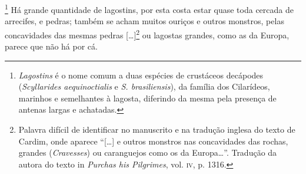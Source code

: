 \begin{linenumbers}
\footnote{ \textit{Lagostins} é o nome comum a
duas espécies de crustáceos decápodes (\textit{Scyllarides
aequinoctialis} e \textit{S. brasiliensis}), da família dos Cilarídeos,
marinhos e semelhantes à lagosta, diferindo da mesma pela presença de
antenas largas e achatadas.} Há grande quantidade de
lagostins, por esta costa estar quase toda cercada de arrecifes, e
pedras; também se acham muitos ouriços e outros monstros, pelas
concavidades das mesmas pedras [\ldots{}]\footnote{ Palavra difícil de
identificar no manuscrito e na tradução inglesa do texto de Cardim,
onde aparece ``[\ldots{}] e outros monstros nas concavidades das rochas,
grandes (\textit{Cravesses}) ou caranguejos como os da Europa\ldots{}''.
Tradução da autora do texto in \textit{Purchas his Pilgrimes}, vol. \textsc{iv},
p. 1316.} ou lagostas grandes, como as da Europa, parece que não há por cá.



\end{linenumbers}
